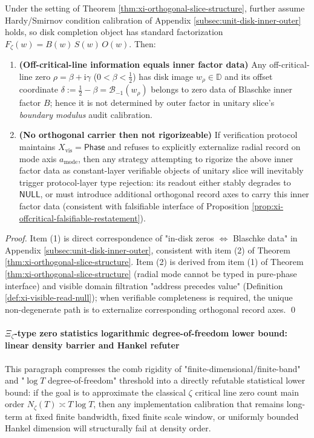 \begin{corollary}\label{cor:xi-inner-factor-orthogonal-register}
Under the setting of Theorem \ref{thm:xi-orthogonal-slice-structure}, further assume Hardy/Smirnov condition calibration of Appendix \ref{subsec:unit-disk-inner-outer} holds, so disk completion object has standard factorization
\(
F_\zeta(w)=B(w)\,S(w)\,O(w)
\).
Then:
\begin{enumerate}
  \item \textbf{(Off-critical-line information equals inner factor data)}
  Any off-critical-line zero \(\rho=\beta+\mathrm{i}\gamma\) (\(0<\beta<\tfrac12\)) has disk image \(w_\rho\in\mathbb{D}\) and its offset coordinate
  \(
  \delta:=\tfrac12-\beta=\mathcal{B}_{-1}(w_\rho)
  \)
  belongs to zero data of Blaschke inner factor \(B\); hence it is not determined by outer factor in unitary slice's \emph{boundary modulus} audit calibration.
  \item \textbf{(No orthogonal carrier then not rigorizeable)}
  If verification protocol maintains \(X_{\mathrm{vis}}=\mathsf{Phase}\) and refuses to explicitly externalize radial record on mode axis \(a_{\mathrm{mode}}\), then any strategy attempting to rigorize the above inner factor data as constant-layer verifiable objects of unitary slice will inevitably trigger protocol-layer type rejection: its readout either stably degrades to \(\mathsf{NULL}\), or must introduce additional orthogonal record axes to carry this inner factor data (consistent with falsifiable interface of Proposition \ref{prop:xi-offcritical-falsifiable-restatement}).
\end{enumerate}
\end{corollary}

\begin{proof}
Item (1) is direct correspondence of "in-disk zeros \(\Leftrightarrow\) Blaschke data" in Appendix \ref{subsec:unit-disk-inner-outer}, consistent with item (2) of Theorem \ref{thm:xi-orthogonal-slice-structure}.
Item (2) is derived from item (1) of Theorem \ref{thm:xi-orthogonal-slice-structure} (radial mode cannot be typed in pure-phase interface) and visible domain filtration "address precedes value" (Definition \ref{def:xi-visible-read-null}); when verifiable completeness is required, the unique non-degenerate path is to externalize corresponding orthogonal record axes. \qed
\end{proof}

\paragraph{\texorpdfstring{$\Xi_\zeta$}{Xi-zeta}-type zero statistics logarithmic degree-of-freedom lower bound: linear density barrier and Hankel refuter}
This paragraph compresses the comb rigidity of "finite-dimensional/finite-band" and "\(\log T\) degree-of-freedom" threshold into a directly refutable statistical lower bound:
if the goal is to approximate the classical \(\zeta\) critical line zero count main order \(N_\zeta(T)\asymp T\log T\), then any implementation calibration that remains long-term at fixed finite bandwidth, fixed finite scale window, or uniformly bounded Hankel dimension will structurally fail at density order.

